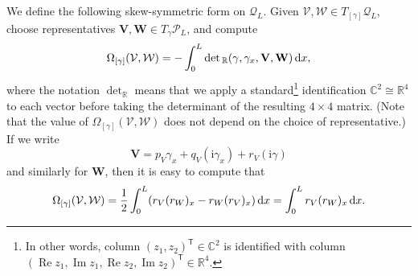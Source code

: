 \documentclass[pdftex]{sigma}
\newcommand\Leg{ {\mathcal P}} %
\newcommand\Legq{\mathcal Q}
\def\ri{\mathrm{i}}
\newcommand\VV{\mathbf V}
\newcommand\VW{\mathbf W}
\newcommand\qV{\mathcal V}%
\newcommand\qW{\mathcal W}
\newcommand{\dx}{\,{\rm d}x}
\def\gam{\gamma} %
\def\C{\mathbb C}
\def\R{\mathbb R}
\renewcommand\Re{\operatorname{Re}}
\renewcommand\Im{\operatorname{Im}}
\numberwithin{equation}{section}
\begin{document}
We define the following skew-symmetric form on $\Legq_L$. Given $\qV, \qW \in T_{[\gamma]}\Legq_L$, choose
representatives $\VV,\VW \in T_\gamma \Leg_L$, and compute
\begin{equation}\label{our2form}
\Omega_{[\gamma]} (\qV, \qW)
= -\int_0^L \det{}_\R( \gam, \gam_x, \VV, \VW)\dx,
\end{equation}
where the notation $\det_\R$ means that we apply a standard\footnote{%
In other words, column $(z_1, z_2)^{\mathsf{T}} \in \C^2$ is identified with column $(\Re z_1, \Im z_1, \Re z_2, \Im z_2)^{\mathsf{T}}\in \R^4$.}
identification $\C^2 \cong \R^4$ to each vector before taking the determinant of the resulting $4\times 4$ matrix.
(Note that the value of $\Omega_{[\gamma]}(\qV, \qW)$
does not depend on the choice of representative.)
If we write
\[\VV = p_V\gam_x + q_V (\ri\gam_x) + r_V (\ri \gam)\]
and similarly for $\VW$, then it is easy to compute that
\[\Omega_{[\gamma]}(\qV, \qW) = \frac12\int_0^L (r_V (r_W)_x - r_W (r_V)_x) \dx = \int_0^L r_V (r_W)_x \dx.\]
\end{document}
